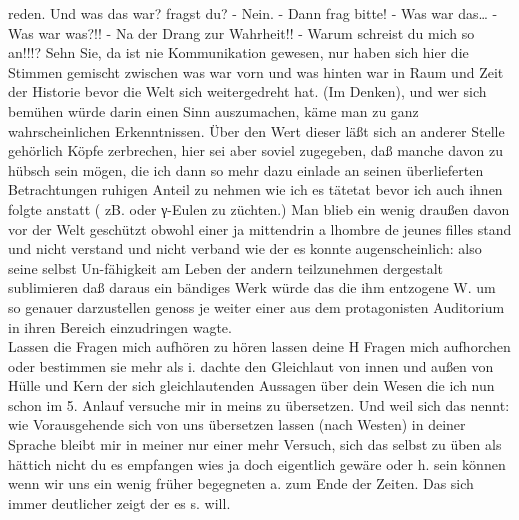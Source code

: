 \documentclass[
]{article}
\begin{document}
reden. Und was das war? fragst du? - Nein. - Dann frag bitte! - Was war
das\ldots{} - Was war was?!! - Na der Drang zur Wahrheit!! - Warum
schreist du mich so an!!!? Sehn Sie, da ist nie Kommunikation gewesen,
nur haben sich hier die Stimmen gemischt zwischen was war vorn und was
hinten war in Raum und Zeit der Historie bevor die Welt sich
weitergedreht hat. (Im Denken), und wer sich bemühen würde darin einen
Sinn auszumachen, käme man zu ganz wahrscheinlichen Erkenntnissen. Über
den Wert dieser läßt sich an anderer Stelle gehörlich Köpfe zerbrechen,
hier sei aber soviel zugegeben, daß manche davon zu hübsch sein mögen,
die ich dann so mehr dazu einlade an seinen überlieferten Betrachtungen
ruhigen Anteil zu nehmen wie ich es tätetat bevor ich auch ihnen folgte
anstatt ( zB. oder γ-Eulen zu züchten.) Man blieb ein wenig draußen
davon vor der Welt geschützt obwohl einer ja mittendrin a
l\textquotesingle hombre de jeunes filles stand und nicht verstand und
nicht verband wie der es konnte augenscheinlich: also seine selbst
Un-fähigkeit am Leben der andern teilzunehmen dergestalt sublimieren daß
daraus ein bändiges Werk würde das die ihm entzogene W. um so genauer
darzustellen genoss je weiter einer aus dem protagonisten Auditorium in
ihren Bereich einzudringen wagte.\\
Lassen die Fragen mich aufhören zu hören lassen deine H Fragen mich
aufhorchen oder bestimmen sie mehr als i. dachte den Gleichlaut von
innen und außen von Hülle und Kern der sich gleichlautenden Aussagen
über dein Wesen die ich nun schon im 5. Anlauf versuche mir in meins zu
übersetzen. Und weil sich das nennt: wie Vorausgehende sich von uns
übersetzen lassen (nach Westen) in deiner Sprache bleibt mir in meiner
nur einer mehr Versuch, sich das selbst zu üben als hättich nicht du es
empfangen wies ja doch eigentlich gewäre oder h. sein können wenn wir
uns ein wenig früher begegneten a. zum Ende der Zeiten. Das sich immer
deutlicher zeigt der es s. will.
\end{document}
